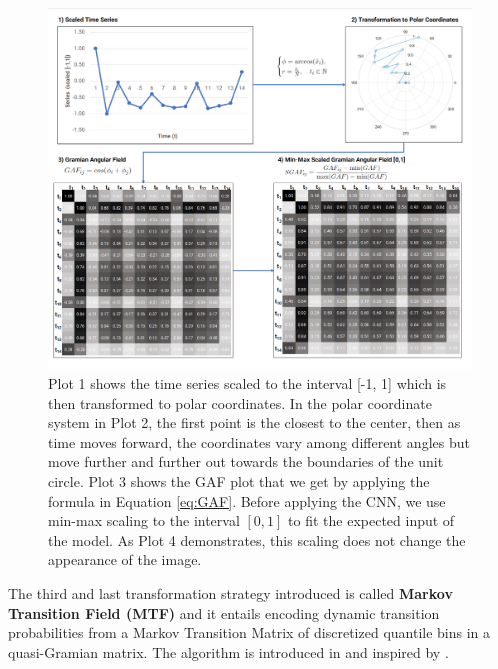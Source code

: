 \documentclass[11pt, a4paper]{article}
\begin{document}
\begin{figure}[]
    \centering
    \includegraphics[width=\textwidth]{images/GAF.png}
    \caption{Plot 1 shows the time series scaled to the interval [-1, 1] which is then transformed to polar coordinates. In the polar coordinate system in Plot 2, the first point is the closest to the center, then as time moves forward, the coordinates vary among different angles but move further and further out towards the boundaries of the unit circle. Plot 3 shows the GAF plot that we get by applying the formula in Equation \ref{eq:GAF}. Before applying the CNN, we use min-max scaling to the interval $[0,1]$ to fit the expected input of the model. As Plot 4 demonstrates, this scaling does not change the appearance of the image.}
    \label{fig:GAF}
\end{figure}


The third and last transformation strategy introduced is called \textbf{Markov Transition Field (MTF)} and it entails encoding dynamic transition probabilities from a Markov Transition Matrix of discretized quantile bins in a quasi-Gramian matrix. The algorithm is introduced in \cite{wang2015encoding} and inspired by \cite{campanharo2011duality}.
\end{document}
